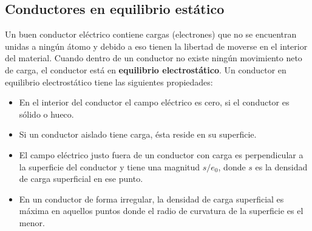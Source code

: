     \subsection{Conductores en equilibrio estático}
      \PN Un buen conductor eléctrico contiene cargas (electrones) que no se encuentran unidas a ningún átomo y debido a
      eso tienen la libertad de moverse en el interior del material. Cuando dentro de un conductor no existe ningún
      movimiento neto de carga, el conductor está en \textbf{equilibrio electrostático}. Un conductor en equilibrio
      electrostático tiene las siguientes propiedades:
      \begin{itemize}
        \item En el interior del conductor el campo eléctrico es cero, si el conductor es sólido o hueco.
        \item Si un conductor aislado tiene carga, ésta reside en su superficie.
        \item El campo eléctrico justo fuera de un conductor con carga es perpendicular a la superficie del conductor y
        tiene una magnitud $s/e_{0}$, donde $s$ es la densidad de carga superficial en ese punto.
        \item En un conductor de forma irregular, la densidad de carga superficial es máxima en aquellos puntos donde el
        radio de curvatura de la superficie es el menor.
      \end{itemize}
